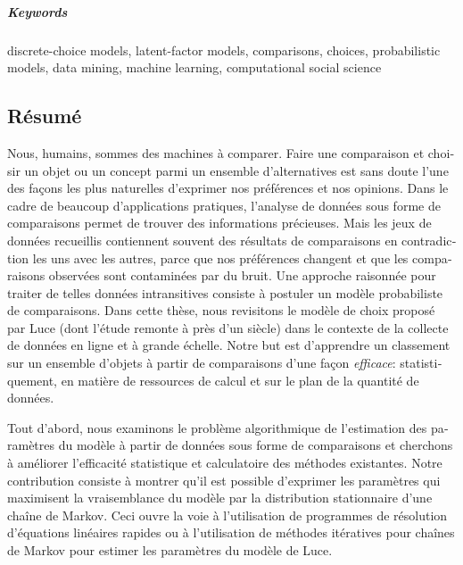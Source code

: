
\paragraph{Keywords}
discrete-choice models, latent-factor models, comparisons, choices, probabilistic models, data mining, machine learning, computational social science

\cleardoublepage

\begin{otherlanguage}{french}
	\chapter*{Résumé}

	Nous, humains, sommes des machines à comparer.
	Faire une comparaison et choisir un objet ou un concept parmi un ensemble d'alternatives est sans doute l'une des façons les plus naturelles d'exprimer nos préférences et nos opinions.
	Dans le cadre de beaucoup d'applications pratiques, l'analyse de données sous forme de comparaisons permet de trouver des informations précieuses.
	Mais les jeux de données recueillis contiennent souvent des résultats de comparaisons en contradiction les uns avec les autres, parce que nos préférences changent et que les comparaisons observées sont contaminées par du bruit.
	Une approche raisonnée pour traiter de telles données intransitives consiste à postuler un modèle probabiliste de comparaisons.
	Dans cette thèse, nous revisitons le modèle de choix proposé par Luce (dont l'étude remonte à près d'un siècle) dans le contexte de la collecte de données en ligne et à grande échelle.
	Notre but est d'apprendre un classement sur un ensemble d'objets à partir de comparaisons d'une façon \emph{efficace}: statistiquement, en matière de ressources de calcul et sur le plan de la quantité de données.

	Tout d'abord, nous examinons le problème algorithmique de l'estimation des paramètres du modèle à partir de données sous forme de comparaisons et cherchons à améliorer l'efficacité statistique et calculatoire des méthodes existantes.
	Notre contribution consiste à montrer qu'il est possible d'exprimer les paramètres qui maximisent la vraisemblance du modèle par la distribution stationnaire d'une chaîne de Markov.
	Ceci ouvre la voie à l'utilisation de programmes de résolution d'équations linéaires rapides ou à l'utilisation de méthodes itératives pour chaînes de Markov pour estimer les paramètres du modèle de Luce.


\end{otherlanguage}
